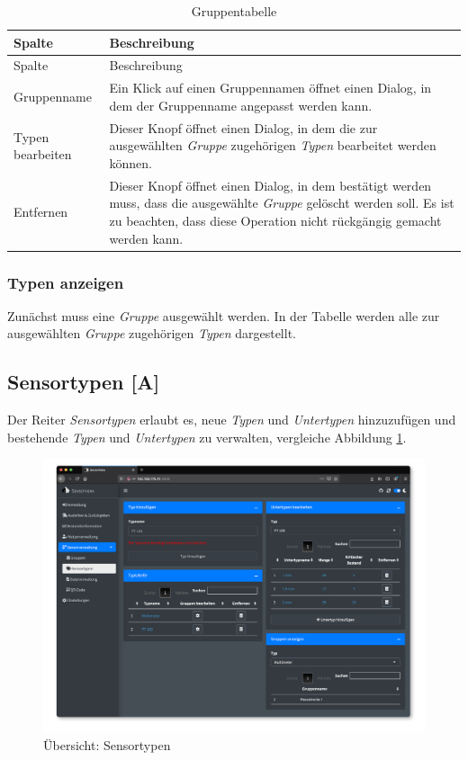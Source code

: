 \documentclass[
]{article}
\begin{document}
\begin{longtable}[]{@{}
  >{\raggedright\arraybackslash}p{}
  >{\raggedright\arraybackslash}p{}@{}}
\caption{\label{tab:group-table} Gruppentabelle}\tabularnewline
\toprule
Spalte & Beschreibung \\
\midrule
\endfirsthead
\toprule
Spalte & Beschreibung \\
\midrule
\endhead
Gruppenname & Ein Klick auf einen Gruppennamen öffnet einen Dialog, in dem der Gruppenname angepasst werden kann. \\
Typen bearbeiten & Dieser Knopf öffnet einen Dialog, in dem die zur ausgewählten \emph{Gruppe} zugehörigen \emph{Typen} bearbeitet werden können. \\
Entfernen & Dieser Knopf öffnet einen Dialog, in dem bestätigt werden muss, dass die ausgewählte \emph{Gruppe} gelöscht werden soll. Es ist zu beachten, dass diese Operation nicht rückgängig gemacht werden kann. \\
\bottomrule
\end{longtable}

\hypertarget{typen-anzeigen}{%
\subsubsection{Typen anzeigen}\label{typen-anzeigen}}

Zunächst muss eine \emph{Gruppe} ausgewählt werden. In der Tabelle werden alle zur ausgewählten \emph{Gruppe} zugehörigen \emph{Typen} dargestellt.

\hypertarget{type}{%
\subsection{Sensortypen {[}A{]}}\label{type}}

Der Reiter \emph{Sensortypen} erlaubt es, neue \emph{Typen} und \emph{Untertypen} hinzuzufügen und bestehende \emph{Typen} und \emph{Untertypen} zu verwalten, vergleiche Abbildung \ref{fig:type-overview}.

\begin{figure}
\centering
\includegraphics{./img/type_overview.png}
\caption{\label{fig:type-overview}Übersicht: Sensortypen}
\end{figure}
\end{document}
